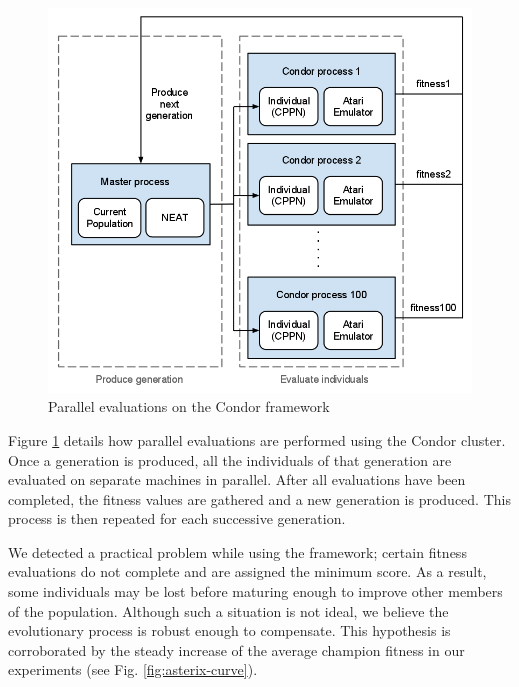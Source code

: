 \documentclass{acm_proc_article-sp}
\begin{document}
\begin{figure}[ht]
\begin{center}
\includegraphics[width=\columnwidth]{figures/condor-hyperneat-small.png}
\end{center}
\caption{Parallel evaluations on the Condor framework}
\label{fig:condor}
\end{figure}

Figure \ref{fig:condor} details how parallel evaluations are performed using the Condor cluster. Once a generation is produced, all the individuals of that generation are evaluated on separate machines in parallel. After all evaluations have been completed, the fitness values are gathered and a new generation is produced. This process is then repeated for each successive generation. 

We detected a practical problem while using the framework; certain fitness evaluations do not complete and are assigned the minimum score. As a result, some individuals may be lost before maturing enough to improve other members of the population. Although such a situation is not ideal, we believe the evolutionary process is robust enough to compensate. This hypothesis is corroborated by the steady increase of the average champion fitness in our experiments (see Fig. \ref{fig:asterix-curve}). 
\end{document}
